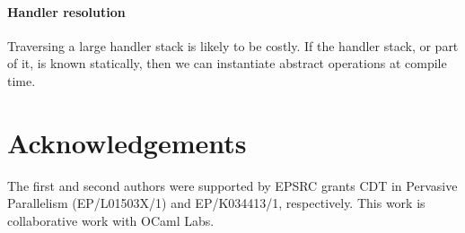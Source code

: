 \documentclass[preprint,numbers]{sigplanconf}
\begin{document}
\paragraph{Handler resolution}
Traversing a large handler stack is likely to be costly. If the
handler stack, or part of it, is known statically, then we can
instantiate abstract operations at compile time.



\section{Acknowledgements}
The first and second authors were supported by EPSRC grants CDT in
Pervasive Parallelism (EP/L01503X/1) and EP/K034413/1,
respectively.  This work is collaborative work with OCaml Labs.

 \softraggedright

\end{document}
